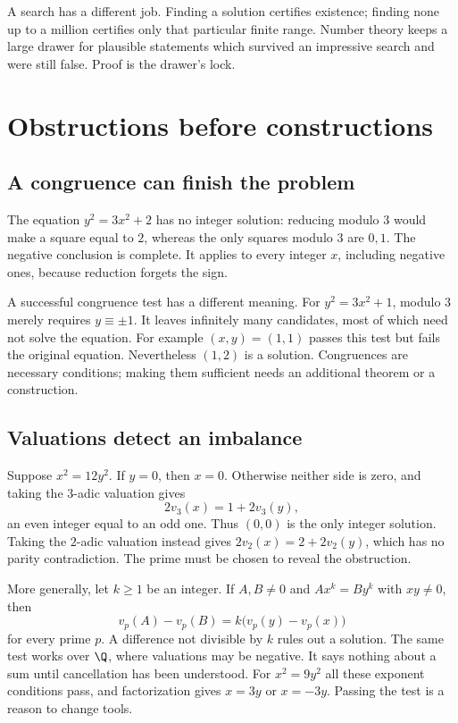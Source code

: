 A search has a different job. Finding a solution certifies existence; finding none up to a million certifies only that particular finite range. Number theory keeps a large drawer for plausible statements which survived an impressive search and were still false. Proof is the drawer's lock.

\section{Obstructions before constructions}

\subsection*{A congruence can finish the problem}
The equation $y^2=3x^2+2$ has no integer solution: reducing modulo $3$
would make a square equal to $2$, whereas the only squares modulo $3$ are
$0,1$. The negative conclusion is complete. It applies to every integer
$x$, including negative ones, because reduction forgets the sign.

A successful congruence test has a different meaning. For $y^2=3x^2+1$,
modulo $3$ merely requires $y\equiv\pm1$. It leaves infinitely many
candidates, most of which need not solve the equation. For example $(x,y)=(1,1)$
passes this test but fails the original equation. Nevertheless $(1,2)$ is a
solution. Congruences are necessary conditions; making them sufficient needs
an additional theorem or a construction.

\subsection*{Valuations detect an imbalance}
Suppose $x^2=12y^2$. If $y=0$, then $x=0$. Otherwise neither side is zero,
and taking the $3$-adic valuation gives
\[
2v_3(x)=1+2v_3(y),
\]
an even integer equal to an odd one. Thus $(0,0)$ is the only integer
solution. Taking the $2$-adic valuation instead gives
$2v_2(x)=2+2v_2(y)$, which has no parity contradiction. The prime must be
chosen to reveal the obstruction.

More generally, let $k\ge1$ be an integer. If $A,B\ne0$ and $Ax^k=By^k$ with $xy\ne0$, then
\[
v_p(A)-v_p(B)=k\bigl(v_p(y)-v_p(x)\bigr)
\]
for every prime $p$. A difference not divisible by $k$ rules out a solution.
The same test works over $\Q$, where valuations may be negative.
It says nothing about a sum until cancellation has been understood.
For $x^2=9y^2$ all these exponent conditions pass, and factorization gives
$x=3y$ or $x=-3y$. Passing the test is a reason to change tools.

